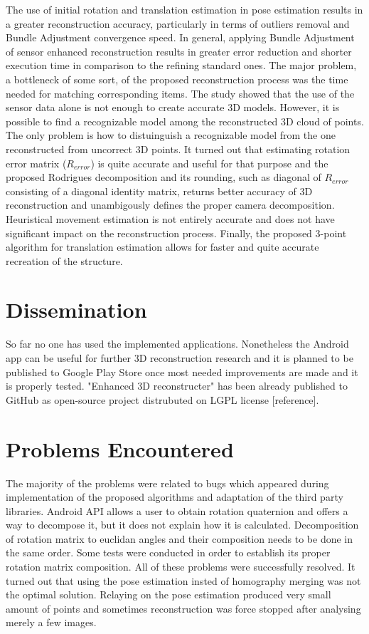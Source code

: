 The use of initial rotation and translation estimation in pose estimation results in a greater reconstruction accuracy, particularly in terms of outliers removal and Bundle Adjustment convergence speed. 
In general, applying Bundle Adjustment of sensor enhanced reconstruction results in greater error reduction and shorter execution time in comparison to the refining standard ones. The major problem, a bottleneck of some sort, of the proposed reconstruction process was the time needed for matching corresponding items. 
The study showed that the use of the sensor data alone is not enough to create accurate 3D models. However, it is possible to find a recognizable model among the reconstructed 3D cloud of points. The only problem is how to distuinguish a recognizable model from the one reconstructed from uncorrect 3D points. It turned out that estimating rotation error matrix ($R_{error}$) is quite accurate and useful for that purpose and the proposed Rodrigues decomposition and its rounding, such as diagonal of $R_{error}$ consisting of a diagonal identity matrix, returns better accuracy of 3D reconstruction and unambigously defines the proper camera decomposition. Heuristical movement estimation is not entirely accurate and does not have significant impact on the reconstruction process. Finally, the proposed 3-point algorithm for translation estimation allows for faster and quite accurate recreation of the structure.
\section{Dissemination}
So far no one has used the implemented applications. Nonetheless the Android app can be useful for further 3D reconstruction research and it is planned to be published to Google Play Store once most needed improvements are made and it is properly tested. "Enhanced 3D reconstructer" has been already published to GitHub as open-source project distrubuted on LGPL license [reference].
\section{Problems Encountered}
The majority of the problems were related to bugs which appeared during implementation of the proposed algorithms and adaptation of the third party libraries. Android API allows a user to obtain rotation quaternion and offers a way to decompose it, but it does not explain how it is calculated. Decomposition of rotation matrix to euclidan angles and their composition needs to be done in the same order. Some tests were conducted in order to establish its proper rotation matrix composition. All of these problems were successfully resolved. It turned out that using the pose estimation insted of homography merging was not the optimal solution. Relaying on the pose estimation produced very small amount of points and sometimes reconstruction was force stopped after analysing merely a few images.
